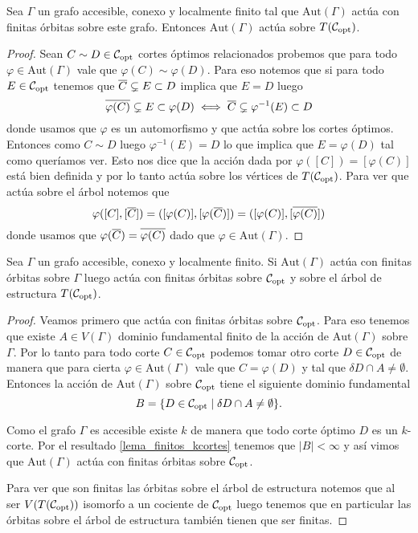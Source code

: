 \documentclass[tesis.tex]{subfiles}
\newcommand{\aut}{\text{Aut}}
\begin{document}
\begin{coro}
	Sea $\Gamma$ un grafo accesible, conexo y localmente finito tal que $\aut(\Gamma)$ actúa con finitas órbitas sobre este grafo.
	Entonces $\aut(\Gamma)$ actúa sobre $T({\cal C}_{\text{opt}})$.
\end{coro}

\begin{proof}
	Sean $C \sim D \in {\cal C}_{\text{opt}}$ cortes óptimos relacionados probemos que para todo $\varphi \in \aut(\Gamma)$ vale que $\varphi(C) \sim \varphi(D)$.
	Para eso notemos que si para todo $E \in {\cal C}_{\text{opt}}$ tenemos que 
	$\overline C \subsetneq E \subset D$ implica que $E = D$ luego
	\[
	\overline {\varphi(C)} \subsetneq E \subset \varphi(D) \iff \overline C \subsetneq \varphi^{-1}(E) \subset D
	\]  
	donde usamos que $\varphi$ es un automorfismo y que actúa sobre los cortes óptimos.
	Entonces como $C \sim D$ luego $\varphi^{-1}(E) = D$ lo que implica que $E = \varphi(D)$ tal como queríamos ver.
	Esto nos dice que la acción dada por $\varphi([C]) = [\varphi (C)]$ está bien definida y por lo tanto actúa sobre los vértices de $T({\cal C}_{\text{opt}})$.
	Para ver que actúa sobre el árbol notemos que 
	\[
		\varphi([C],[\overline C]) = ([\varphi (C)], [\varphi (\overline C)]) = ([\varphi (C)], [\overline{\varphi (C)}])
	\]
	donde usamos que $\varphi(\overline{C}) = \overline{\varphi(C)}$ dado que $\varphi \in \aut(\Gamma)$.
	
\end{proof}


\begin{lema}\label{lema_finitas_orbitas}
	Sea $\Gamma$ un grafo accesible, conexo y localmente finito.
	Si $\aut(\Gamma)$ actúa con finitas órbitas sobre $\Gamma$ luego actúa con finitas órbitas sobre ${\cal C}_{\text{opt}}$ y sobre el árbol de estructura $T({\cal C}_{\text{opt}})$.
\end{lema} 
\begin{proof}
	Veamos primero que actúa con finitas órbitas sobre ${\cal C}_{\text{opt}}$.
	Para eso tenemos que existe $A \in V(\Gamma)$ dominio fundamental finito de la acción de $\aut(\Gamma)$ sobre $\Gamma$.
	Por lo tanto para todo corte $C \in {\cal C}_{\text{opt}}$ podemos tomar otro corte $D \in {\cal C}_{\text{opt}}$ de manera que para cierta $\varphi \in \aut(\Gamma)$ vale que $C  = \varphi(D)$ y tal que $\delta D \cap A \neq \emptyset$.
	Entonces la acción de $\aut(\Gamma)$ sobre ${\cal C}_{\text{opt}}$ tiene el siguiente dominio fundamental
	\[
		B = \{  D \in {\cal C}_{\text{opt}} \mid \delta D \cap A \neq \emptyset \}.
	\]
	
	Como el grafo $\Gamma$ es accesible existe $k$ de manera que todo corte óptimo $D$ es un $k$-corte.
	Por el resultado \ref{lema_finitos_kcortes} tenemos que $|B| < \infty$ y así vimos que $\aut(\Gamma)$ actúa con finitas órbitas sobre ${\cal C}_{\text{opt}}$. 
	
	Para ver que son finitas las órbitas sobre el árbol de estructura notemos que al ser $V(T({\cal C}_{\text{opt}}))$ isomorfo a un cociente de ${\cal C}_{\text{opt}}$ luego tenemos que en particular las órbitas sobre el árbol de estructura también tienen que ser finitas.
	
\end{proof}
\end{document}
